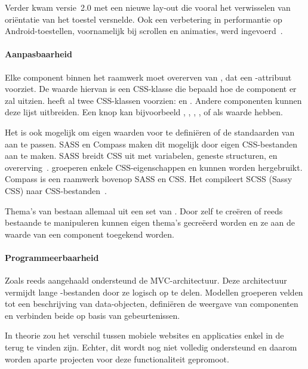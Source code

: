 Verder kwam versie~2.0 met een nieuwe lay-out  die vooral het verwisselen van oriëntatie van het toestel versnelde.  
Ook een verbetering in performantie op Android-toestellen,  voornamelijk bij scrollen en animaties,  werd ingevoerd~\cite{Inc.}.

\paragraph{Aanpasbaarheid}
\label{sec:sencha-aanpasbaarheid}
Elke component binnen het raamwerk moet overerven van , dat een -attribuut voorziet.  
De waarde hiervan is een CSS-klasse die bepaald hoe de component er zal uitzien.  
\st{} heeft al twee CSS-klassen voorzien:   en .  
Andere componenten kunnen deze lijst uitbreiden.  
Een knop kan bijvoorbeeld ,  ,  ,  ,   of  als  waarde hebben.

Het is ook mogelijk om eigen waarden voor  te definiëren of de standaarden van \st{} aan te passen.  
SASS en Compass maken dit mogelijk door eigen CSS-bestanden aan te maken.  
SASS breidt CSS uit met variabelen,  geneste structuren,  en overerving~\cite{Eppstein2013}.  
 groeperen enkele CSS-eigenschappen en kunnen worden hergebruikt.  
Compass is een raamwerk bovenop SASS en CSS.  
Het compileert SCSS (Sassy CSS) naar CSS-bestanden~\cite{Eppstein2013a}.        

Thema's van \st{} bestaan allemaal uit een set van .  
Door zelf  te creëren of reeds bestaande te manipuleren kunnen eigen thema's gecreëerd worden en ze aan de  waarde van een component toegekend worden.

\paragraph{Programmeerbaarheid}
\label{sec:sencha-programmeerbaarheid}
Zoals reeds aangehaald ondersteund \st{} de MVC-architectuur.  
Deze architectuur vermijdt lange \js{}-bestanden door ze logisch op te delen.  
Modellen groeperen velden tot een beschrijving van data-objecten,  definiëren de weergave van componenten en  verbinden beide op basis van gebeurtenissen.

In theorie zou het verschil tussen mobiele websites en applicaties enkel in de  terug te vinden zijn.  
Echter,  dit wordt nog niet volledig ondersteund en daarom worden aparte projecten voor deze functionaliteit gepromoot.

